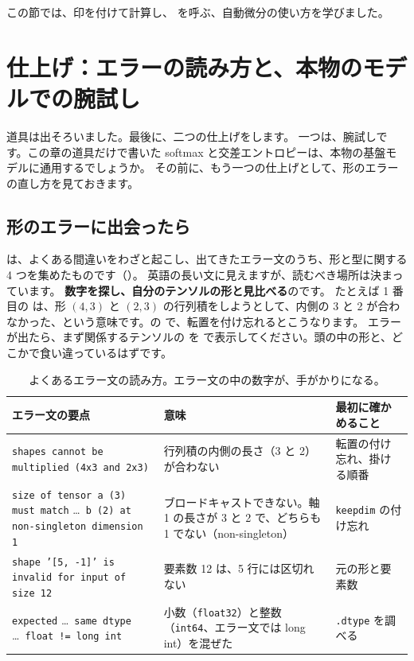 この節では、印を付けて計算し、 を呼ぶ、自動微分の使い方を学びました。

\section{仕上げ：エラーの読み方と、本物のモデルでの腕試し}\label{sec:pt-final}

道具は出そろいました。最後に、二つの仕上げをします。
一つは、腕試しです。この章の道具だけで書いた softmax と交差エントロピーは、本物の基盤モデルに通用するでしょうか。
その前に、もう一つの仕上げとして、形のエラーの直し方を見ておきます。

\subsection*{形のエラーに出会ったら}

は、よくある間違いをわざと起こし、出てきたエラー文のうち、形と型に関する 4 つを集めたものです（）。
英語の長い文に見えますが、読むべき場所は決まっています。
\textbf{数字を探し、自分のテンソルの形と見比べる}のです。
たとえば 1 番目の  は、形 $(4,3)$ と $(2,3)$ の行列積をしようとして、内側の 3 と 2 が合わなかった、という意味です。の  で、転置を付け忘れるとこうなります。
エラーが出たら、まず関係するテンソルの  を  で表示してください。頭の中の形と、どこかで食い違っているはずです。

\begin{table}[tbp]
\centering
\caption{よくあるエラー文の読み方。エラー文の中の数字が、手がかりになる。}
\label{tab:pt-errors}
\footnotesize
\begin{tabularx}{\linewidth}{@{}>{\raggedright\arraybackslash}p{43mm}>{\raggedright\arraybackslash}X>{\raggedright\arraybackslash}p{31mm}@{}}
\toprule
エラー文の要点 & 意味 & 最初に確かめること \\
\midrule
\texttt{shapes cannot be multiplied (4x3 and 2x3)} & 行列積の内側の長さ（3 と 2）が合わない & 転置の付け忘れ、掛ける順番 \\
\texttt{size of tensor a (3) must match} \dots\ \texttt{b (2) at non-singleton dimension 1} & ブロードキャストできない。軸 1 の長さが 3 と 2 で、どちらも 1 でない（non-singleton） & \texttt{keepdim} の付け忘れ \\
\texttt{shape '[5, -1]' is invalid for input of size 12} & 要素数 12 は、5 行には区切れない & 元の形と要素数 \\
\texttt{expected} \dots\ \texttt{same dtype} \dots\ \texttt{float != long int} & 小数（\texttt{float32}）と整数（\texttt{int64}、エラー文では long int）を混ぜた & \texttt{.dtype} を調べる \\
\bottomrule
\end{tabularx}
\end{table}

